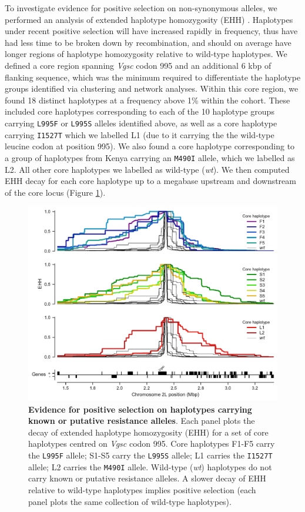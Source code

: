 \documentclass[a4paper,11pt,abstracton,hidelinks]{scrartcl}
\begin{document}
%
To investigate evidence for positive selection on non-synonymous alleles, we performed an analysis of extended haplotype homozygosity (EHH) \cite{Sabeti2002}.
%
Haplotypes under recent positive selection will have increased rapidly in frequency, thus have had less time to be broken down by recombination, and should on average have longer regions of haplotype homozygosity relative to wild-type haplotypes.
%
We defined a core region spanning \textit{Vgsc} codon 995 and an additional 6 kbp of flanking sequence, which was the minimum required to differentiate the haplotype groups identified via clustering and network analyses.
%
Within this core region, we found 18 distinct haplotypes at a frequency above 1\% within the cohort.
%
These included core haplotypes corresponding to each of the 10 haplotype groups carrying \texttt{L995F} or \texttt{L995S} alleles identified above, as well as a core haplotype carrying \texttt{I1527T} which we labelled L1 (due to it carrying the the wild-type leucine codon at position 995).
%
We also found a core haplotype corresponding to a group of haplotypes from Kenya carrying an \texttt{M490I} allele, which we labelled as L2.
%
All other core haplotypes we labelled as wild-type (\textit{wt}).
%
We then computed EHH decay for each core haplotype up to a megabase upstream and downstream of the core locus (Figure \ref{fig:ehh_decay}).
%


%
\begin{figure}[!t]
  \includegraphics[width=1.1\linewidth,center]{artwork/ehh_decay_old_clusters.pdf}
  \caption{\textbf{Evidence for positive selection on haplotypes carrying known or putative resistance alleles}. Each panel plots the decay of extended haplotype homozygosity (EHH) for a set of core haplotypes centred on \textit{Vgsc} codon 995. Core haplotypes F1-F5 carry the \texttt{L995F} allele; S1-S5 carry the \texttt{L995S} allele; L1 carries the \texttt{I1527T} allele; L2 carries the \texttt{M490I} allele. Wild-type (\textit{wt}) haplotypes do not carry known or putative resistance alleles. A slower decay of EHH relative to wild-type haplotypes implies positive selection (each panel plots the same collection of wild-type haplotypes).}
  \label{fig:ehh_decay}
\end{figure}
\end{document}
